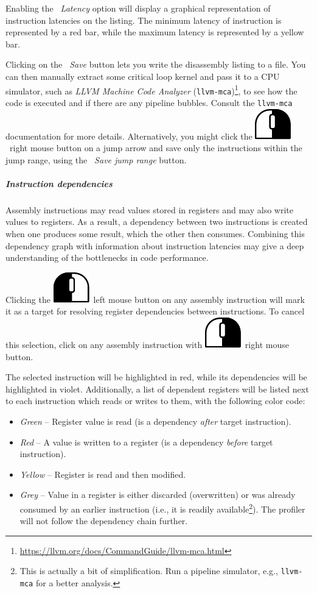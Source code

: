 \documentclass[hidelinks,titlepage,a4paper]{article}
\newcommand{\LMB}{\includegraphics[height=.8\baselineskip]{icons/lmb}}
\newcommand{\RMB}{\includegraphics[height=.8\baselineskip]{icons/rmb}}
\begin{document}
Enabling the \emph{\faTruckLoading{}~Latency} option will display a graphical representation of instruction latencies on the listing. The minimum latency of instruction is represented by a red bar, while the maximum latency is represented by a yellow bar.

Clicking on the \emph{\faFileImport{}~Save} button lets you write the disassembly listing to a file. You can then manually extract some critical loop kernel and pass it to a CPU simulator, such as \emph{LLVM Machine Code Analyzer} (\texttt{llvm-mca})\footnote{\url{https://llvm.org/docs/CommandGuide/llvm-mca.html}}, to see how the code is executed and if there are any pipeline bubbles. Consult the \texttt{llvm-mca} documentation for more details. Alternatively, you might click the \RMB{}~right mouse button on a jump arrow and save only the instructions within the jump range, using the \emph{\faFileImport{}~Save jump range} button.

\subparagraph{Instruction dependencies}

Assembly instructions may read values stored in registers and may also write values to registers. As a result, a dependency between two instructions is created when one produces some result, which the other then consumes. Combining this dependency graph with information about instruction latencies may give a deep understanding of the bottlenecks in code performance.

Clicking the \LMB{}~left mouse button on any assembly instruction will mark it as a target for resolving register dependencies between instructions. To cancel this selection, click on any assembly instruction with \RMB{}~right mouse button.

The selected instruction will be highlighted in red, while its dependencies will be highlighted in violet. Additionally, a list of dependent registers will be listed next to each instruction which reads or writes to them, with the following color code:

\begin{itemize}
\item \emph{Green} -- Register value is read (is a dependency \emph{after} target instruction).
\item \emph{Red} -- A value is written to a register (is a dependency \emph{before} target instruction).
\item \emph{Yellow} -- Register is read and then modified.
\item \emph{Grey} -- Value in a register is either discarded (overwritten) or was already consumed by an earlier instruction (i.e., it is readily available\footnote{This is actually a bit of simplification. Run a pipeline simulator, e.g., \texttt{llvm-mca} for a better analysis.}). The profiler will not follow the dependency chain further.
\end{itemize}
\end{document}
